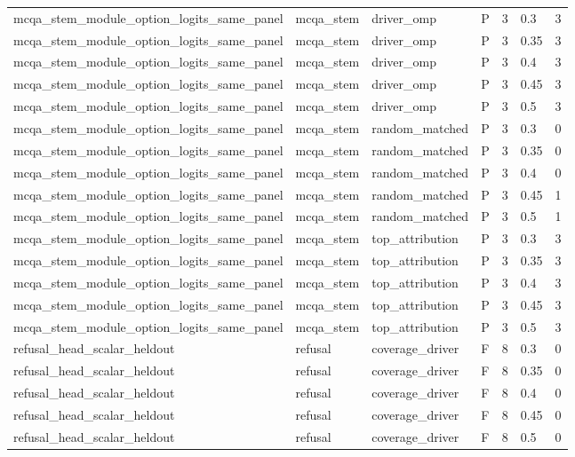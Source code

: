 \begin{tabular}{lllllll}
mcqa\_stem\_module\_option\_logits\_same\_panel & mcqa\_stem & driver\_omp & P & 3 & 0.3 & 3 \\
mcqa\_stem\_module\_option\_logits\_same\_panel & mcqa\_stem & driver\_omp & P & 3 & 0.35 & 3 \\
mcqa\_stem\_module\_option\_logits\_same\_panel & mcqa\_stem & driver\_omp & P & 3 & 0.4 & 3 \\
mcqa\_stem\_module\_option\_logits\_same\_panel & mcqa\_stem & driver\_omp & P & 3 & 0.45 & 3 \\
mcqa\_stem\_module\_option\_logits\_same\_panel & mcqa\_stem & driver\_omp & P & 3 & 0.5 & 3 \\
mcqa\_stem\_module\_option\_logits\_same\_panel & mcqa\_stem & random\_matched & P & 3 & 0.3 & 0 \\
mcqa\_stem\_module\_option\_logits\_same\_panel & mcqa\_stem & random\_matched & P & 3 & 0.35 & 0 \\
mcqa\_stem\_module\_option\_logits\_same\_panel & mcqa\_stem & random\_matched & P & 3 & 0.4 & 0 \\
mcqa\_stem\_module\_option\_logits\_same\_panel & mcqa\_stem & random\_matched & P & 3 & 0.45 & 1 \\
mcqa\_stem\_module\_option\_logits\_same\_panel & mcqa\_stem & random\_matched & P & 3 & 0.5 & 1 \\
mcqa\_stem\_module\_option\_logits\_same\_panel & mcqa\_stem & top\_attribution & P & 3 & 0.3 & 3 \\
mcqa\_stem\_module\_option\_logits\_same\_panel & mcqa\_stem & top\_attribution & P & 3 & 0.35 & 3 \\
mcqa\_stem\_module\_option\_logits\_same\_panel & mcqa\_stem & top\_attribution & P & 3 & 0.4 & 3 \\
mcqa\_stem\_module\_option\_logits\_same\_panel & mcqa\_stem & top\_attribution & P & 3 & 0.45 & 3 \\
mcqa\_stem\_module\_option\_logits\_same\_panel & mcqa\_stem & top\_attribution & P & 3 & 0.5 & 3 \\
refusal\_head\_scalar\_heldout & refusal & coverage\_driver & F & 8 & 0.3 & 0 \\
refusal\_head\_scalar\_heldout & refusal & coverage\_driver & F & 8 & 0.35 & 0 \\
refusal\_head\_scalar\_heldout & refusal & coverage\_driver & F & 8 & 0.4 & 0 \\
refusal\_head\_scalar\_heldout & refusal & coverage\_driver & F & 8 & 0.45 & 0 \\
refusal\_head\_scalar\_heldout & refusal & coverage\_driver & F & 8 & 0.5 & 0 \\

\end{tabular}
